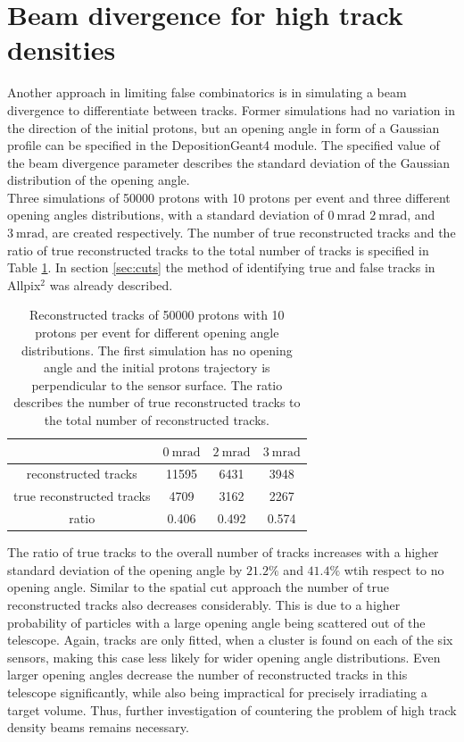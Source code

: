 \section{Beam divergence for high track densities}
Another approach in limiting false combinatorics is in simulating a beam divergence to differentiate between tracks. Former simulations had no variation
in the direction of the initial protons, but an opening angle in form of a Gaussian profile can be specified in the DepositionGeant4 module. The specified value of
the beam divergence parameter describes the standard deviation of the Gaussian distribution of the opening angle.  \\
Three simulations of 50000 protons with 10 protons per event and three different opening angles distributions, with a standard deviation of $\SI{0}{\milli\radian}$
$\SI{2}{\milli\radian}$, and $\SI{3}{\milli\radian}$, are created respectively.
The number of true reconstructed tracks and the ratio
of true reconstructed tracks to the total number of tracks is specified in Table \ref{tab:angle}. In section \ref{sec:cuts} the method of identifying
true and false tracks in Allpix$^2$ was already described.

\begin{table}
  \centering
  \caption{Reconstructed tracks of 50000 protons with 10 protons per event for different opening angle
  distributions. The first simulation has no opening angle and the initial protons
  trajectory is perpendicular to the sensor surface.
  The ratio describes the number of true reconstructed tracks to the total number of reconstructed tracks.}
  \begin{tabular}{c | c c c}
    \toprule
     &  $\SI{0}{\milli\radian}$ & $\SI{2}{\milli\radian}$ & $\SI{3}{\milli\radian}$\\
    \midrule
    reconstructed tracks & 11595 & 6431 & 3948  \\
    true reconstructed tracks & 4709 & 3162 & 2267 \\
    ratio & 0.406 & 0.492 & 0.574
  \end{tabular}
  \label{tab:angle}
\end{table}

The ratio of true tracks to the overall number of tracks increases with a higher standard deviation of the opening angle by $21.2\%$ and $41.4\%$ wtih respect to
no opening angle. Similar to the spatial cut approach the
number of true reconstructed tracks also decreases considerably. This is due to a higher probability of particles with a large opening angle being scattered out of the telescope.
Again, tracks are only fitted, when a cluster is found on each of the six sensors, making this case less likely for wider opening angle distributions.
Even larger opening angles decrease the number of reconstructed tracks in this telescope significantly, while also being impractical for precisely irradiating a target volume.
Thus, further investigation of countering the problem of high track density beams remains necessary.

